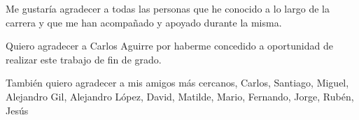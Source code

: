 Me gustaría agradecer a todas las personas que he conocido a lo largo de la carrera y que me han acompañado y apoyado durante la misma.

Quiero agradecer a Carlos Aguirre por haberme concedido a oportunidad de realizar este trabajo de fin de grado.

También quiero agradecer a mis amigos más cercanos, Carlos, Santiago, Miguel, Alejandro Gil, Alejandro López, David, Matilde, Mario, Fernando, Jorge, Rubén, Jesús
